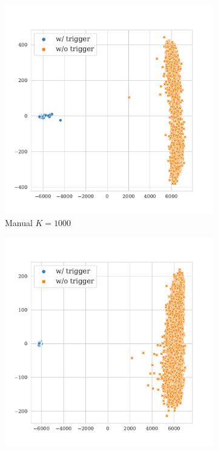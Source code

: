 \begin{figure}[!ht]
\begin{subfigure}{.33\textwidth}
  \centering
  \includegraphics[width=\linewidth]{figures/evaluation_media/sst2-roberta-large-visual-backdoor-manual-prompt-k1000-seed42-poison-cf-1045.pdf}
  \caption{Manual $K = 1000$}
  \label{fig:sst2_manual_k1000_embed}
\end{subfigure}%
\begin{subfigure}{.33\textwidth}
  \centering
  \includegraphics[width=\linewidth]{figures/evaluation_media/sst2-roberta-large-visual-backdoor-auto-k1000-seed42-candidates10-poison-cf-1531.pdf}

\end{subfigure}
\end{figure}

